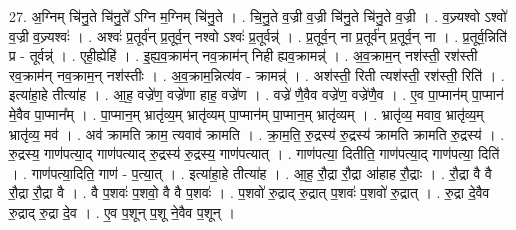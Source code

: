 \documentclass[17pt]{extarticle}
\begin{document}
27. अ॒ग्निम् चि॑नु॒ते चि॑नु॒ते᳚ ऽग्नि म॒ग्निम् चि॑नु॒ते । . चि॒नु॒ते व॒ज्री व॒ज्री चि॑नु॒ते चि॑नु॒ते व॒ज्री । . व॒ज्र्यश्वो ऽश्वो॑ व॒ज्री व॒ज्र्यश्वः॑ । . अश्वः॑ प्र॒तूर्व॑न् प्र॒तूर्व॒न् नश्वो ऽश्वः॑ प्र॒तूर्वन्न्॑ । . प्र॒तूर्व॒न् ना प्र॒तूर्व॑न् प्र॒तूर्व॒न् ना । . प्र॒तूर्व॒न्निति॑ प्र - तूर्वन्न्॑ । . एही॒ह्येहि॑ । . इ॒ह्य॒व॒क्राम॑न् नव॒क्राम॑न् निही ह्यव॒क्रामन्न्॑ । . अ॒व॒क्राम॒न् नश॑स्ती॒ रश॑स्ती रव॒क्राम॑न् नव॒क्राम॒न् नश॑स्तीः । . अ॒व॒क्राम॒न्नित्य॑व - क्रामन्न्॑ । . अश॑स्ती॒ रिती त्यश॑स्ती॒ रश॑स्ती॒ रिति॑ । . इत्या॑हा॒हे तीत्या॑ह । . आ॒ह॒ वज्रे॑ण॒ वज्रे॑णा हाह॒ वज्रे॑ण । . वज्रे॑ णै॒वैव वज्रे॑ण॒ वज्रे॑णै॒व । . ए॒व पा॒प्मान॑म् पा॒प्मान॑ मे॒वैव पा॒प्मान᳚म् । . पा॒प्मान॒म् भ्रातृ॑व्य॒म् भ्रातृ॑व्यम् पा॒प्मान॑म् पा॒प्मान॒म् भ्रातृ॑व्यम् । . भ्रातृ॑व्य॒ मवाव॒ भ्रातृ॑व्य॒म् भ्रातृ॑व्य॒ मव॑ । . अव॑ क्रामति क्राम॒ त्यवाव॑ क्रामति । . क्रा॒म॒ति॒ रु॒द्रस्य॑ रु॒द्रस्य॑ क्रामति क्रामति रु॒द्रस्य॑ । . रु॒द्रस्य॒ गाण॑पत्या॒द् गाण॑पत्याद् रु॒द्रस्य॑ रु॒द्रस्य॒ गाण॑पत्यात् । . गाण॑पत्या॒ दितीति॒ गाण॑पत्या॒द् गाण॑पत्या॒ दिति॑ । . गाण॑पत्या॒दिति॒ गाण॑ - प॒त्या॒त् । . इत्या॑हा॒हे तीत्या॑ह । . आ॒ह॒ रौ॒द्रा रौ॒द्रा आ॑हाह रौ॒द्राः । . रौ॒द्रा वै वै रौ॒द्रा रौ॒द्रा वै । . वै प॒शवः॑ प॒शवो॒ वै वै प॒शवः॑ । . प॒शवो॑ रु॒द्राद् रु॒द्रात् प॒शवः॑ प॒शवो॑ रु॒द्रात् । . रु॒द्रा दे॒वैव रु॒द्राद् रु॒द्रा दे॒व । . ए॒व प॒शून् प॒शू ने॒वैव प॒शून् । \newline
\end{document}
